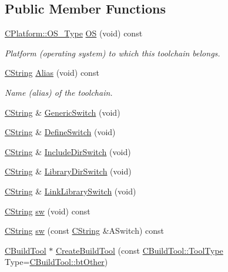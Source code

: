 \subsection*{Public Member Functions}
\begin{DoxyCompactItemize}
\item 
\hyperlink{classCPlatform_a2fb735c63c53052f79629e338bb0f535}{C\-Platform\-::\-O\-S\-\_\-\-Type} \hyperlink{classCToolChain_abe4054d9081351e099163e2c53b260f8}{O\-S} (void) const 
\begin{DoxyCompactList}\small\item\em Platform (operating system) to which this toolchain belongs. \end{DoxyCompactList}\item 
\hyperlink{classCString}{C\-String} \hyperlink{classCToolChain_a81b15f66df2066155de40f6fb975a613}{Alias} (void) const 
\begin{DoxyCompactList}\small\item\em Name (alias) of the toolchain. \end{DoxyCompactList}\item 
\hyperlink{classCString}{C\-String} \& \hyperlink{classCToolChain_a6b812fe8db4d55267fd7c7ad0b065abe}{Generic\-Switch} (void)
\item 
\hyperlink{classCString}{C\-String} \& \hyperlink{classCToolChain_a06e6e1f342bff69990fc3b473111ff42}{Define\-Switch} (void)
\item 
\hyperlink{classCString}{C\-String} \& \hyperlink{classCToolChain_abd38643780c937a6526e493b01ccff17}{Include\-Dir\-Switch} (void)
\item 
\hyperlink{classCString}{C\-String} \& \hyperlink{classCToolChain_a10c552862de661ff3fd768d26bc97e47}{Library\-Dir\-Switch} (void)
\item 
\hyperlink{classCString}{C\-String} \& \hyperlink{classCToolChain_afe2b0bc1fb442f1da7b2803a1e1b175a}{Link\-Library\-Switch} (void)
\item 
\hyperlink{classCString}{C\-String} \hyperlink{classCToolChain_af61058748b7566ead7a40827f79a8b31}{sw} (void) const 
\item 
\hyperlink{classCString}{C\-String} \hyperlink{classCToolChain_a9cc4b8a255a8dc420be52368d2a6f5bf}{sw} (const \hyperlink{classCString}{C\-String} \&A\-Switch) const 
\item 
\hyperlink{classCBuildTool}{C\-Build\-Tool} $\ast$ \hyperlink{classCToolChain_af93b3ff256aa8e9c6962c286d353370e}{Create\-Build\-Tool} (const \hyperlink{classCBuildTool_a1a622843617ddf9b0ebb1c09c3437e6d}{C\-Build\-Tool\-::\-Tool\-Type} Type=\hyperlink{classCBuildTool_a1a622843617ddf9b0ebb1c09c3437e6dab1bafc4d8b635a113d8aa8df402db376}{C\-Build\-Tool\-::bt\-Other})

\end{DoxyCompactItemize}
